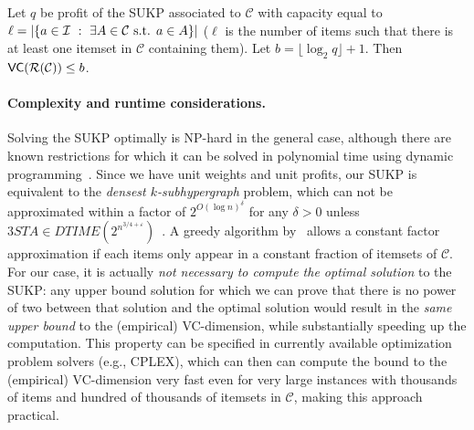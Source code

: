\begin{corollary}\label{lem:sukpvc}
  Let $q$ be profit of the SUKP associated to $\mathcal{C}$ with capacity
  equal to $\ell=|\{a\in{\cal I} ~:~ \exists A\in\mathcal{C} \mbox{ s.t. } a\in
  A\}|$ ($\ell$ is the number of items such that there is at least one itemset in $\mathcal{C}$ containing
  them).
  Let $b=\lfloor\log_2 q\rfloor + 1$. Then
  $\mathsf{VC}(\mathcal{R}(\mathcal{C}))\le b$. %
\end{corollary}

\paragraph{Complexity and runtime considerations.} Solving the SUKP optimally is
NP-hard in the general case, although there are known restrictions for
which it can be solved in polynomial time using dynamic
programming~\citep{GoldschmidtNY94}. Since we have unit weights and unit
profits, our SUKP is equivalent to the \emph{densest $k$-subhypergraph} problem,
which can not be approximated within a factor of $2^{O(\log n)^\delta}$ for any
$\delta>0$ unless $3STA \in
DTIME(2^{n^{3/4+\varepsilon}})$~\citep{HajiaghayiJKLMRSV06}. A greedy algorithm
by~\citet{Arulselvan14} allows a constant factor approximation if each
items only appear in a constant fraction of itemsets of $\mathcal{C}$. 
For our case, it is actually \emph{not necessary to compute the optimal
solution} to the SUKP: any upper bound solution for which we can prove that
there is no power of two between that solution and the optimal solution would
result in the \emph{same upper bound} to the (empirical) VC-dimension, while
substantially speeding up the computation. This property can be specified in
currently available optimization problem solvers (e.g., CPLEX), which can then can compute the
bound to the (empirical) VC-dimension very fast even for very large instances
with thousands of items and hundred of thousands of itemsets in $\mathcal{C}$,
making this approach practical. 

